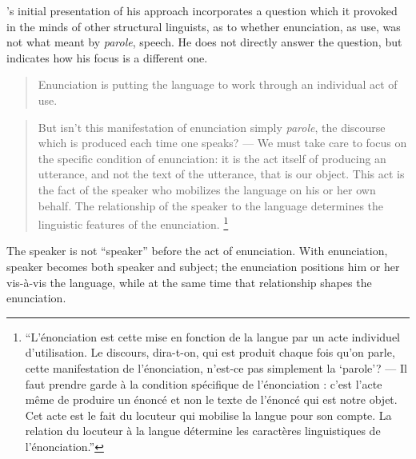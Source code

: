 \documentclass[output=paper]{langscibook}
\begin{document}
{\Benveniste}'s initial presentation of his approach incorporates a question which it provoked in the minds of other structural linguists, as to whether enunciation, as use, was not what {\Saussure} meant by \emph{parole}, speech. He does not directly answer the question, but indicates how his focus is a different one.

\begin{quotation}
Enunciation is putting the language to work through an individual act of use.
\end{quotation}

\begin{quotation}
But isn't this manifestation of enunciation simply \emph{parole}, the discourse which is produced each time one speaks? — We must take care to focus on the specific condition of enunciation: it is the act itself of producing an utterance, and not the text of the utterance, that is our object. This act is the fact of the speaker who mobilizes the language on his or her own behalf. The relationship of the speaker to the language determines the linguistic features of the enunciation. \citep[80]{Benveniste1970appareil}\footnote{``L'énonciation est cette mise en fonction de la langue par un acte individuel d'utilisation. Le discours, dira-t-on, qui est produit chaque fois qu'on parle, cette manifestation de l'énonciation, n'est-ce pas simplement la `parole'? — Il faut prendre garde à la condition spécifique de l'énonciation : c’est l'acte même de produire un énoncé et non le texte de l'énoncé qui est notre objet. Cet acte est le fait du locuteur qui mobilise la langue pour son compte. La relation du locuteur à la langue détermine les caractères linguistiques de l'énonciation.''}
\end{quotation}

The speaker is not ``speaker'' before the act of enunciation. With enunciation, speaker becomes both speaker and subject; the enunciation positions him or her vis-à-vis the language, while at the same time that relationship shapes the enunciation.
\end{document}
